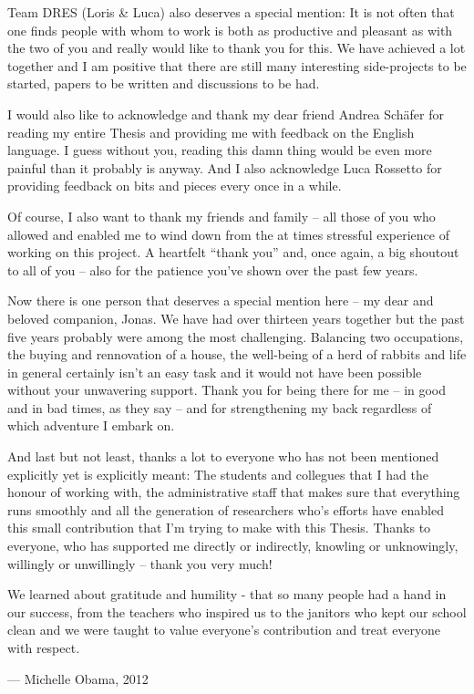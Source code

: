 Team DRES (Loris \& Luca) also deserves a special mention: It is not often that one finds people with whom to work is both as productive and pleasant as with the two of you and really would like to thank you for this. We have achieved a lot together and I am positive that there are still many interesting side-projects to be started, papers to be written and discussions to be had.

I would also like to acknowledge and thank my dear friend Andrea Schäfer for reading my entire Thesis and providing me with feedback on the English language. I guess without you, reading this damn thing would be even more painful than it probably is anyway. And I also acknowledge Luca Rossetto for providing feedback on bits and pieces every once in a while.

Of course, I also want to thank my friends and family -- all those of you who allowed and enabled me to wind down from the at times stressful experience of working on this project. A heartfelt ``thank you'' and, once again, a big shoutout to all of you -- also for the patience you've shown over the past few years.

Now there is one person that deserves a special mention here -- my dear and beloved companion, Jonas. We have had over thirteen years together but the past five years probably were among the most challenging. Balancing two occupations, the buying and rennovation of a house, the well-being of a herd of rabbits and life in general certainly isn't an easy task and it would not have been possible without your unwavering support. Thank you for being there for me -- in good and in bad times, as they say -- and for strengthening my back regardless of which adventure I embark on.

And last but not least, thanks a lot to everyone who has not been mentioned explicitly yet is explicitly meant: The students and collegues that I had the honour of working with, the administrative staff that makes sure that everything runs smoothly and all the generation of researchers who's efforts have enabled this small contribution that I'm trying to make with this Thesis. Thanks to everyone, who has supported me directly or indirectly, knowling or unknowingly, willingly or unwillingly -- thank you very much!

\epigraph{We learned about gratitude and humility - that so many people had a hand in our success, from the teachers who inspired us to the janitors who kept our school clean and we were taught to value everyone's contribution and treat everyone with respect.}{--- \textup{Michelle Obama}, 2012}


\cleardoublepage
